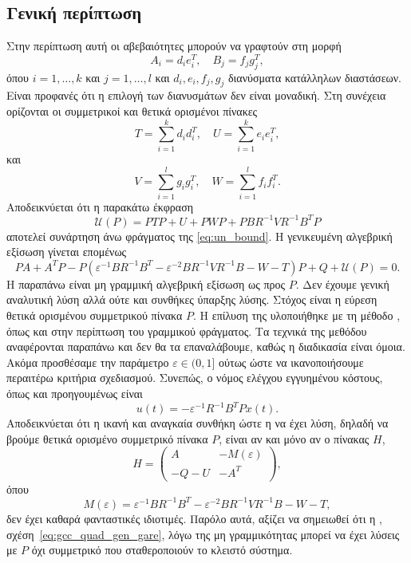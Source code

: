 \subsection{Γενική περίπτωση}
Στην περίπτωση αυτή οι αβεβαιότητες μπορούν να γραφτούν στη μορφή
\[
    A_i = d_ie_i^T, \quad
    B_j = f_jg_j^T,
\]
όπου \( i = 1, \dots, k \) και \( j = 1, \dots, l \) και \(d_i, e_i, f_j, g_j \)
διανύσματα κατάλληλων διαστάσεων. Είναι προφανές ότι η επιλογή των διανυσμάτων
δεν είναι μοναδική. Στη συνέχεια ορίζονται οι συμμετρικοί και θετικά ορισμένοι
πίνακες
\[
    T = \sum_{i = 1}^k d_id_i^T, \quad
    U = \sum_{i = 1}^k e_ie_i^T,
\]
και
\[
    V = \sum_{i = 1}^l g_ig_i^T, \quad
    W = \sum_{i = 1}^l f_if_i^T.
\]
Αποδεικνύεται ότι η παρακάτω έκφραση
\[
    \mathcal{U}(P) = PTP + U + PWP + PBR^{-1}VR^{-1}B^TP
\]
αποτελεί συνάρτηση άνω φράγματος της \eqref{eq:un_bound}. Η γενικευμένη αλγεβρική εξίσωση
 γίνεται επομένως
\begin{equation}\label{eq:gcc_quad_gen_gare}
    PA + A^TP - P
    \left(\varepsilon^{-1}BR^{-1}B^T - \varepsilon^{-2}BR^{-1}VR^{-1}B - W - T\right)
    P + Q + \mathcal{U}(P) = 0.
\end{equation}
Η παραπάνω είναι μη γραμμική αλγεβρική εξίσωση ως προς \( P \). Δεν έχουμε
γενική αναλυτική λύση αλλά ούτε και συνθήκες ύπαρξης λύσης. Στόχος είναι η
εύρεση θετικά ορισμένου συμμετρικού πίνακα \( P \). Η επίλυση της υλοποιήθηκε
με τη μέθοδο , όπως και στην περίπτωση του γραμμικού φράγματος.
Τα τεχνικά της μεθόδου αναφέρονται παραπάνω και δεν θα τα επαναλάβουμε,
καθώς η διαδικασία είναι όμοια. Ακόμα προσθέσαμε την παράμετρο
\( \varepsilon \in (0, 1] \) ούτως ώστε να ικανοποιήσουμε περαιτέρω κριτήρια
σχεδιασμού. Συνεπώς, ο νόμος ελέγχου εγγυημένου κόστους, όπως και προηγουμένως είναι
\begin{equation}\label{eq:gcc_quad_gen_u}
    u(t) = -\varepsilon^{-1}R^{-1}B^{T}Px(t).
\end{equation}
Αποδεικνύεται ότι η ικανή και αναγκαία συνθήκη ώστε η  να έχει λύση,
δηλαδή να βρούμε θετικά ορισμένο συμμετρικό πίνακα \( P \), είναι αν και μόνο
αν ο πίνακας \( H \),
\[
    H =
    \begin{pmatrix}
        A & -M(\varepsilon) \\
        -Q - U & -A^T
    \end{pmatrix},
\]
όπου
\[
    M(\varepsilon) =
    \varepsilon^{-1}BR^{-1}B^T - \varepsilon^{-2}BR^{-1}VR^{-1}B - W - T,
\]
δεν έχει καθαρά φανταστικές ιδιοτιμές. Παρόλο αυτά, αξίζει να σημειωθεί ότι
η , σχέση~\eqref{eq:gcc_quad_gen_gare}, λόγω της μη γραμμικότητας
μπορεί να έχει λύσεις με \( P \) όχι συμμετρικό που σταθεροποιούν το κλειστό
σύστημα.

